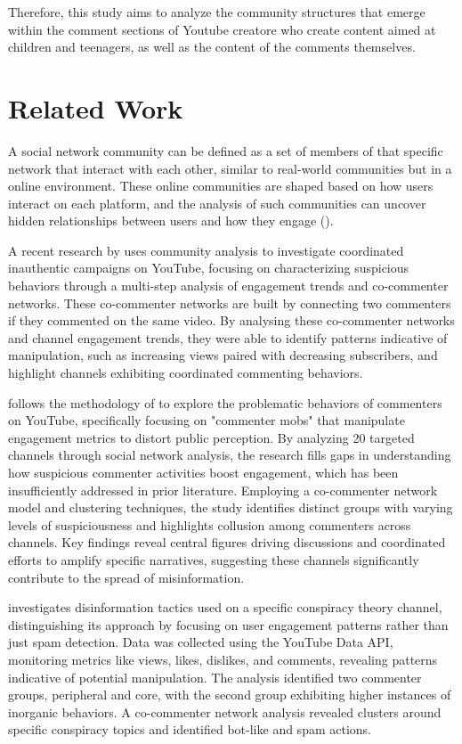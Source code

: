 \documentclass[12pt]{article}
\begin{document}
Therefore, this study aims to analyze the community structures that emerge within the comment 
sections of Youtube creatore who create content aimed at children and teenagers, 
as well as the content of the comments themselves.

\section{Related Work}

A social network community can be defined as a set of members of that specific network that interact
with each other, similar to real-world communities but in a online environment.
These online communities are shaped based on how users interact on each platform, and the analysis
of such communities can uncover hidden relationships between users and how they engage (\cite{nooribakhsh2024community}).

A recent research by \cite{kirdemir2023} uses community analysis to investigate coordinated 
inauthentic campaigns on YouTube, focusing on characterizing suspicious behaviors through a 
multi-step analysis of engagement trends and co-commenter networks. These co-commenter networks are
built by connecting two commenters if they commented on the same video.
By analysing these co-commenter networks and channel engagement trends, they were able to identify
patterns indicative of manipulation, such as increasing views paired with decreasing subscribers, 
and highlight channels exhibiting coordinated 
commenting behaviors. 

\cite{shajari2023} follows the methodology of \cite{kirdemir2023} to
explore the problematic behaviors of commenters on YouTube, specifically focusing on "commenter mobs" 
that manipulate engagement metrics to distort public perception. 
By analyzing 20 targeted channels through social network analysis, the research fills gaps in 
understanding how suspicious commenter activities boost engagement, which has been insufficiently 
addressed in prior literature. Employing a co-commenter network model and clustering techniques, 
the study identifies distinct groups with varying levels of suspiciousness and highlights collusion 
among commenters across channels. Key findings reveal central figures driving discussions and 
coordinated efforts to amplify specific narratives, suggesting these channels significantly contribute 
to the spread of misinformation. 

\cite{hussain2018analyzing} investigates disinformation tactics used on a specific conspiracy theory 
channel, distinguishing its approach by focusing on user engagement patterns rather 
than just spam detection. Data was collected using the YouTube Data API, monitoring metrics like views, 
likes, dislikes, and comments, revealing patterns indicative of potential manipulation. 
The analysis identified two commenter groups, peripheral and core, with the second group exhibiting higher 
instances of inorganic behaviors. A co-commenter network analysis revealed clusters around specific 
conspiracy topics and identified bot-like and spam actions. 
\end{document}
